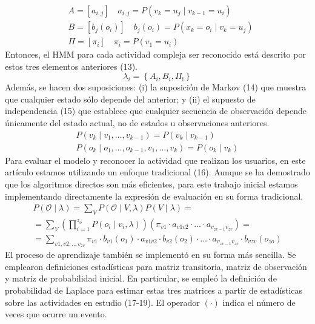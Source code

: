 \documentclass[10pt]{article}
\begin{document}
$$
\begin{aligned}
& A=\left[a_{i, j}\right] \quad a_{i, j}=P\left(v_{k}=u_{j} \mid v_{k-1}=u_{i}\right) \\
& B=\left[b_{j}\left(o_{i}\right)\right] \quad b_{j}\left(o_{i}\right)=P\left(x_{k}=o_{i} \mid v_{k}=u_{j}\right) \\
& \Pi=\left[\pi_{i}\right] \quad \pi_{i}=P\left(v_{1}=u_{i}\right)
\end{aligned}
$$
Entonces, el HMM para cada actividad compleja    ser reconocido está descrito por estos tres elementos anteriores (13).
$$
\lambda_{i}=\left\{A_{i}, B_{i}, \Pi_{\mathrm{i}}\right\}
$$
Además, se hacen dos suposiciones: (i) la suposición de Markov (14) que muestra que cualquier estado sólo depende del anterior; y (ii) el supuesto de independencia (15) que establece que cualquier secuencia de observación depende únicamente del estado actual, no de estados u observaciones anteriores.
$$
\begin{gathered}
P\left(v_{k} \mid v_{1}, \ldots, v_{k-1}\right)=P\left(v_{k} \mid v_{k-1}\right) \\
P\left(o_{k} \mid o_{1}, \ldots, o_{k-1}, v_{1}, \ldots, v_{k}\right)=P\left(o_{k} \mid v_{k}\right)
\end{gathered}
$$
Para evaluar el modelo y reconocer la actividad que realizan los usuarios, en este artículo estamos utilizando un enfoque tradicional (16). Aunque se ha demostrado que los algoritmos directos son más eficientes, para este trabajo inicial estamos implementando directamente la expresión de evaluación en su forma tradicional.
$$
\begin{gathered}
P(\mathcal{O} \mid \lambda)=\sum_{V} P(\mathcal{O} \mid V, \lambda) P(V \mid \lambda)= \\
=\sum_{V}\left(\prod_{i=1}^{z_{o}} P\left(o_{i} \mid v_{i}, \lambda\right)\right)\left(\pi_{v 1} \cdot a_{v 1 v 2} \cdot \ldots \cdot a_{v_{z v-1} v_{z v}}\right)= \\
=\sum_{v 1, v 2, . ., v_{z v}} \pi_{v 1} \cdot b_{v 1}\left(o_{1}\right) \cdot a_{v 1 v 2} \cdot b_{v 2}\left(o_{2}\right) \cdot \ldots \cdot a_{v_{z v-1} v_{z v}} \cdot b_{v z v}\left(o_{z o}\right)
\end{gathered}
$$
El proceso de aprendizaje también se implementó en su forma más sencilla. Se emplearon definiciones estadísticas para matriz transitoria, matriz de observación y matriz de probabilidad inicial. En particular, se empleó la definición de probabilidad de Laplace para estimar estas tres matrices a partir de estadísticas sobre las actividades en estudio (17-19). El operador $(\cdot)$ indica el número de veces que ocurre un evento.
\end{document}
